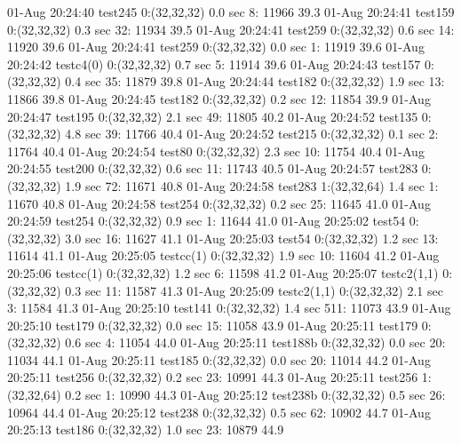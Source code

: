 01-Aug 20:24:40 test245     0:(32,32,32)     0.0 sec    8: 11966 39.3%
01-Aug 20:24:41 test159     0:(32,32,32)     0.3 sec   32: 11934 39.5%
01-Aug 20:24:41 test259     0:(32,32,32)     0.6 sec   14: 11920 39.6%
01-Aug 20:24:41 test259     0:(32,32,32)     0.0 sec    1: 11919 39.6%
01-Aug 20:24:42 testc4(0)   0:(32,32,32)     0.7 sec    5: 11914 39.6%
01-Aug 20:24:43 test157     0:(32,32,32)     0.4 sec   35: 11879 39.8%
01-Aug 20:24:44 test182     0:(32,32,32)     1.9 sec   13: 11866 39.8%
01-Aug 20:24:45 test182     0:(32,32,32)     0.2 sec   12: 11854 39.9%
01-Aug 20:24:47 test195     0:(32,32,32)     2.1 sec   49: 11805 40.2%
01-Aug 20:24:52 test135     0:(32,32,32)     4.8 sec   39: 11766 40.4%
01-Aug 20:24:52 test215     0:(32,32,32)     0.1 sec    2: 11764 40.4%
01-Aug 20:24:54 test80      0:(32,32,32)     2.3 sec   10: 11754 40.4%
01-Aug 20:24:55 test200     0:(32,32,32)     0.6 sec   11: 11743 40.5%
01-Aug 20:24:57 test283     0:(32,32,32)     1.9 sec   72: 11671 40.8%
01-Aug 20:24:58 test283     1:(32,32,64)     1.4 sec    1: 11670 40.8%
01-Aug 20:24:58 test254     0:(32,32,32)     0.2 sec   25: 11645 41.0%
01-Aug 20:24:59 test254     0:(32,32,32)     0.9 sec    1: 11644 41.0%
01-Aug 20:25:02 test54      0:(32,32,32)     3.0 sec   16: 11627 41.1%
01-Aug 20:25:03 test54      0:(32,32,32)     1.2 sec   13: 11614 41.1%
01-Aug 20:25:05 testcc(1)   0:(32,32,32)     1.9 sec   10: 11604 41.2%
01-Aug 20:25:06 testcc(1)   0:(32,32,32)     1.2 sec    6: 11598 41.2%
01-Aug 20:25:07 testc2(1,1) 0:(32,32,32)     0.3 sec   11: 11587 41.3%
01-Aug 20:25:09 testc2(1,1) 0:(32,32,32)     2.1 sec    3: 11584 41.3%
01-Aug 20:25:10 test141     0:(32,32,32)     1.4 sec  511: 11073 43.9%
01-Aug 20:25:10 test179     0:(32,32,32)     0.0 sec   15: 11058 43.9%
01-Aug 20:25:11 test179     0:(32,32,32)     0.6 sec    4: 11054 44.0%
01-Aug 20:25:11 test188b    0:(32,32,32)     0.0 sec   20: 11034 44.1%
01-Aug 20:25:11 test185     0:(32,32,32)     0.0 sec   20: 11014 44.2%
01-Aug 20:25:11 test256     0:(32,32,32)     0.2 sec   23: 10991 44.3%
01-Aug 20:25:11 test256     1:(32,32,64)     0.2 sec    1: 10990 44.3%
01-Aug 20:25:12 test238b    0:(32,32,32)     0.5 sec   26: 10964 44.4%
01-Aug 20:25:12 test238     0:(32,32,32)     0.5 sec   62: 10902 44.7%
01-Aug 20:25:13 test186     0:(32,32,32)     1.0 sec   23: 10879 44.9%
